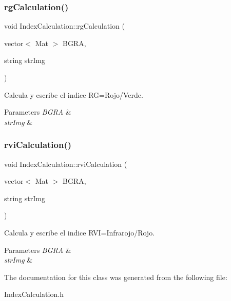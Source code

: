 \subsubsection{\texorpdfstring{rg\+Calculation()}{rgCalculation()}}
{\footnotesize\ttfamily void Index\+Calculation\+::rg\+Calculation (\begin{DoxyParamCaption}\item[{vector$<$ Mat $>$}]{B\+G\+RA,  }\item[{string}]{str\+Img }\end{DoxyParamCaption})\hspace{0.3cm}{\ttfamily [inline]}}



Calcula y escribe el indice RG=Rojo/\+Verde. 


\begin{DoxyParams}{Parameters}
{\em B\+G\+RA} & \\
\hline
{\em str\+Img} & \\
\hline
\end{DoxyParams}
\mbox{\label{classIndexCalculation_abd44fe3dd27ccd9641f29152fdf19a2e}} 
\subsubsection{\texorpdfstring{rvi\+Calculation()}{rviCalculation()}}
{\footnotesize\ttfamily void Index\+Calculation\+::rvi\+Calculation (\begin{DoxyParamCaption}\item[{vector$<$ Mat $>$}]{B\+G\+RA,  }\item[{string}]{str\+Img }\end{DoxyParamCaption})\hspace{0.3cm}{\ttfamily [inline]}}



Calcula y escribe el indice R\+VI=Infrarojo/\+Rojo. 


\begin{DoxyParams}{Parameters}
{\em B\+G\+RA} & \\
\hline
{\em str\+Img} & \\
\hline
\end{DoxyParams}


The documentation for this class was generated from the following file\+:\begin{DoxyCompactItemize}
\item 
Index\+Calculation.\+h\end{DoxyCompactItemize}

